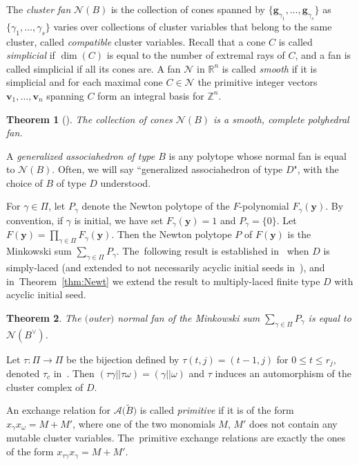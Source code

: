 \documentclass[10pt,a4paper]{amsart}
\def\R{{\mathbb R}}
\def\Z{{\mathbb Z}}
\def\A{{\mathcal{A}}}
\def\tB{{\tilde B}}
\def\tB{{\tilde B}}
\def\y{{\mathbf y}}
\def\v{{\mathbf v}}
\def\N{{\mathcal{N}}}
\def\g{{\mathbf g}}
\numberwithin{equation}{section}
\newtheorem{Theorem}{Theorem}[section]
\begin{document}
\bigskip{}
The {\it cluster fan} $\N(B)$ is the collection of cones spanned by $\{\g_{\gamma_1},\dots,\g_{\gamma_s}\}$ as $\{\gamma_1,\dots,\gamma_s\}$ varies over collections of cluster variables that belong to the same cluster, called {\it compatible} cluster variables. Recall that a cone $C$ is called {\it simplicial} if $\dim(C)$ is equal to the number of extremal rays of $C$, and a fan is called simplicial if all its cones are. A fan $\N$ in $\R^n$ is called {\it smooth} if it is simplicial and for each maximal cone $C \in \N$ the primitive integer vectors $\v_1,\dots,\v_n$ spanning $C$ form an integral basis for $\Z^n$.

\begin{Theorem}[{\cite{CFZ,FZY,HLT}}]\label{thm:clusterfan}
The collection of cones $\N(B)$ is a smooth, complete polyhedral fan.
\end{Theorem}

A \emph{generalized associahedron of type $B$} is any polytope whose normal fan is equal to $\N(B)$.
Often, we will say ``generalized associahedron of type $D$", with the choice of $B$ of type $D$ understood.

\bigskip{}
For $\gamma \in \Pi$, let $P_\gamma$ denote the Newton polytope of the $F$-polynomial $F_\gamma(\y)$. By convention, if $\gamma$ is initial, we have set $F_\gamma(\y) = 1$ and $P_\gamma = \{0\}$. Let~$F(\y) = \prod_{\gamma \in \Pi} F_\gamma(\y)$. Then the Newton polytope $P$ of $F(\y)$ is the Minkowski sum $\sum_{\gamma \in \Pi} P_\gamma$. The~following result is established in~\cite{BDMTY} when $D$ is simply-laced (and extended to not necessarily acyclic initial seeds in~\cite{Fei2}), and in~Theorem~\ref{thm:Newt} we extend the result to multiply-laced finite type $D$ with acyclic initial seed.

\begin{Theorem}\label{thm:FNewton}
The $($outer$)$ normal fan of the Minkowski sum $\sum_{\gamma \in \Pi} P_\gamma$ is equal to $\N(B^\vee)$.
\end{Theorem}

\medskip{} %
Let $\tau\colon \Pi \to \Pi$ be the bijection defined by $\tau(t,j) = (t-1,j)$ for $0 \leq t \leq r_j$, denoted $\tau_c$ in~\cite{YZ}. Then $(\tau \gamma|| \tau \omega) = (\gamma|| \omega)$ and $\tau$ induces an automorphism of the cluster complex of $D$.

An exchange relation for $\A\big(\tB\big)$ is called \emph{primitive} if it is of the form $x_\gamma x_{\omega} = M + M'$, where one of the two monomials $M$, $M'$ does not contain any mutable cluster variables. The~primitive exchange relations are exactly the ones of the form $x_{\tau \gamma} x_{\gamma} = M + M'$.
\end{document}

